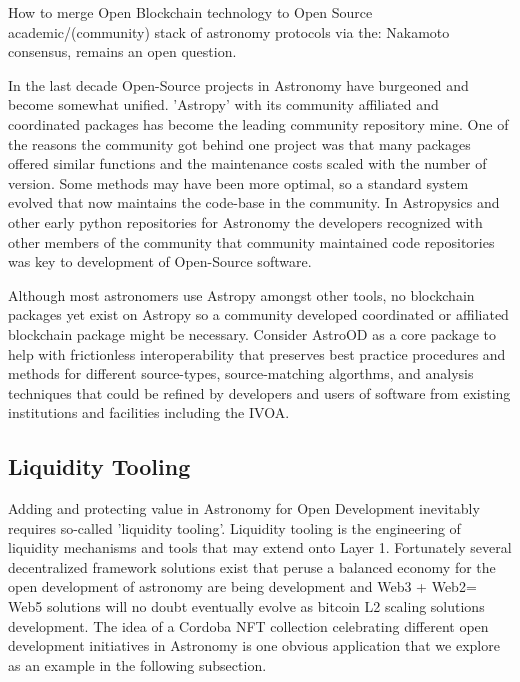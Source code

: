 \documentclass[final,5p,times,twocolumn,authoryear]{elsarticle}
\begin{document}
How to merge Open Blockchain technology to Open Source academic/(community) stack of astronomy protocols via the: Nakamoto consensus, remains an open question.

In the last decade Open-Source projects in Astronomy have burgeoned and become somewhat unified. 'Astropy' with its community affiliated and coordinated packages has become the leading community repository mine.  One of the reasons the community got behind one project was that many packages offered similar functions and the maintenance costs scaled with the number of version. Some methods may have been more optimal, so a standard system evolved that now maintains the code-base in the community. In Astropysics and other early python repositories for Astronomy the developers recognized with other members of the community that community maintained code repositories was key to development of Open-Source software.

Although most astronomers use Astropy amongst other tools, no blockchain packages yet exist on Astropy so a community developed coordinated or affiliated blockchain package might be necessary. Consider AstroOD as a core package to help with frictionless interoperability that preserves best practice procedures and methods for different source-types, source-matching algorthms, and analysis techniques that could be refined by developers and users of software from existing institutions and facilities including the IVOA.
\subsection{Liquidity Tooling}
\label{btc2:sec:sub:liquidity}
Adding and protecting value in Astronomy for Open Development inevitably requires so-called 'liquidity tooling'. Liquidity tooling is the engineering of liquidity mechanisms and tools that may extend onto Layer 1. Fortunately several decentralized framework solutions exist that peruse a balanced economy for the open development of astronomy are being development and Web3 + Web2= Web5 solutions will no doubt eventually evolve as bitcoin L2 scaling solutions development. The idea of a Cordoba NFT collection celebrating different open development initiatives in Astronomy is one obvious application that we explore as an example in the following subsection. 
\end{document}

